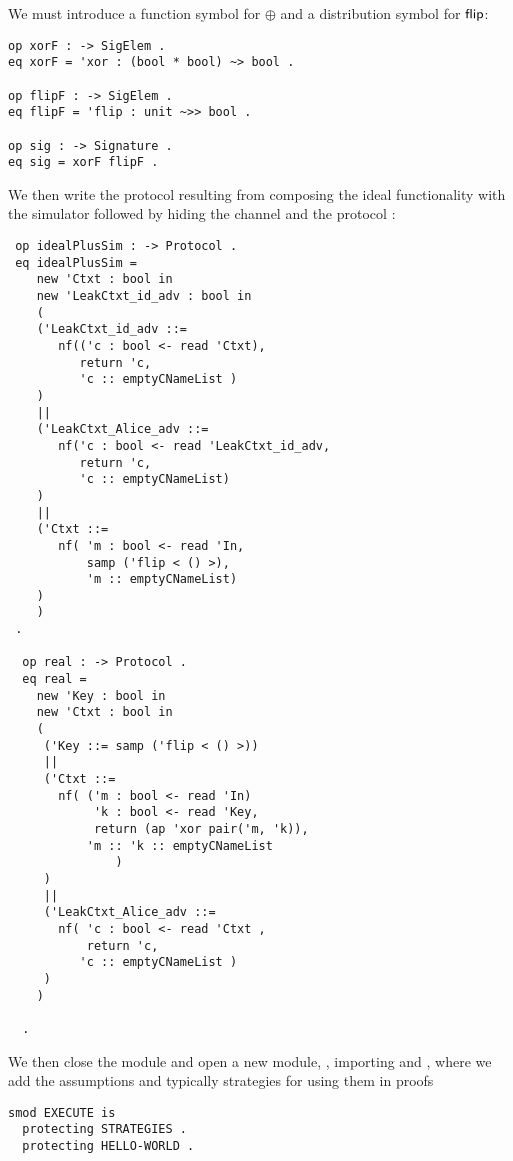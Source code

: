 We must introduce a function symbol for $\oplus$ and 
a distribution symbol for $\mathsf{flip}$:
\begin{lstlisting}
op xorF : -> SigElem .
eq xorF = 'xor : (bool * bool) ~> bool .

op flipF : -> SigElem .
eq flipF = 'flip : unit ~>> bool .

op sig : -> Signature .
eq sig = xorF flipF .
\end{lstlisting}
We then write the protocol resulting from composing the ideal functionality
with the simulator followed by hiding the channel 
and the protocol :
\begin{lstlisting}
 op idealPlusSim : -> Protocol .
 eq idealPlusSim = 
    new 'Ctxt : bool in
    new 'LeakCtxt_id_adv : bool in
    (
    ('LeakCtxt_id_adv ::= 
       nf(('c : bool <- read 'Ctxt),
          return 'c,
          'c :: emptyCNameList )
    )  
    ||
    ('LeakCtxt_Alice_adv ::= 
       nf('c : bool <- read 'LeakCtxt_id_adv,
          return 'c, 
          'c :: emptyCNameList)
    )
    ||
    ('Ctxt ::= 
       nf( 'm : bool <- read 'In,
           samp ('flip < () >),
           'm :: emptyCNameList)
    )
    )
 .
 
  op real : -> Protocol .
  eq real = 
    new 'Key : bool in
    new 'Ctxt : bool in
    (
     ('Key ::= samp ('flip < () >))
     || 
     ('Ctxt ::= 
       nf( ('m : bool <- read 'In)
            'k : bool <- read 'Key,
            return (ap 'xor pair('m, 'k)),
           'm :: 'k :: emptyCNameList
               )
     )
     ||
     ('LeakCtxt_Alice_adv ::= 
       nf( 'c : bool <- read 'Ctxt ,
           return 'c,
          'c :: emptyCNameList )  
     )
    ) 
         
  .
\end{lstlisting}

We then close the  module and
open a new module, , importing  and
, where we add the assumptions and typically strategies
for using them in proofs
\begin{lstlisting}
smod EXECUTE is
  protecting STRATEGIES .
  protecting HELLO-WORLD .
\end{lstlisting}

